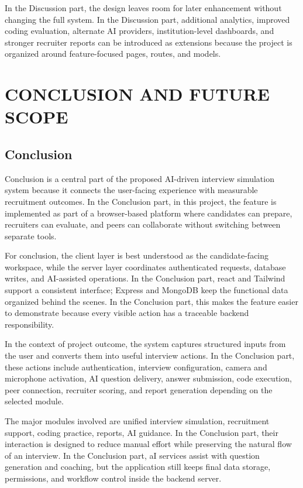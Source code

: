 \documentclass[12pt,a4paper]{report}
\begin{document}
In the Discussion part, the design leaves room for later enhancement without changing the full system. In the Discussion part, additional analytics, improved coding evaluation, alternate AI providers, institution-level dashboards, and stronger recruiter reports can be introduced as extensions because the project is organized around feature-focused pages, routes, and models.


\chapter{CONCLUSION AND FUTURE SCOPE}

\section{Conclusion}

Conclusion is a central part of the proposed AI-driven interview simulation system because it connects the user-facing experience with measurable recruitment outcomes. In the Conclusion part, in this project, the feature is implemented as part of a browser-based platform where candidates can prepare, recruiters can evaluate, and peers can collaborate without switching between separate tools.


For conclusion, the client layer is best understood as the candidate-facing workspace, while the server layer coordinates authenticated requests, database writes, and AI-assisted operations. In the Conclusion part, react and Tailwind support a consistent interface; Express and MongoDB keep the functional data organized behind the scenes. In the Conclusion part, this makes the feature easier to demonstrate because every visible action has a traceable backend responsibility.


In the context of project outcome, the system captures structured inputs from the user and converts them into useful interview actions. In the Conclusion part, these actions include authentication, interview configuration, camera and microphone activation, AI question delivery, answer submission, code execution, peer connection, recruiter scoring, and report generation depending on the selected module.


The major modules involved are unified interview simulation, recruitment support, coding practice, reports, AI guidance. In the Conclusion part, their interaction is designed to reduce manual effort while preserving the natural flow of an interview. In the Conclusion part, aI services assist with question generation and coaching, but the application still keeps final data storage, permissions, and workflow control inside the backend server.
\end{document}
